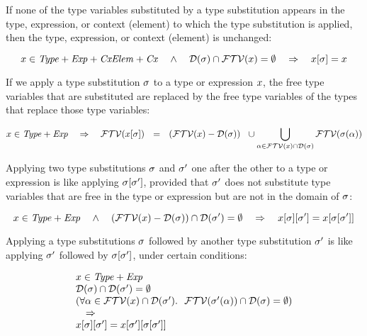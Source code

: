 If none of the type variables substituted by a type substitution appears in
the type, expression, or context (element) to which the type substitution is
applied, then the type, expression, or context (element) is unchanged:

\begin{theorem}\label{thm-tsbs-not-free}
\[
x\in\mathit{Type}+\mathit{Exp}+\mathit{CxElem}+\mathit{Cx}
\ \ \ \wedge\ \ \
\mathcal{D}(\sigma)\cap\mathcal{FTV}(x)=\emptyset
\ \ \ \Rightarrow\ \ \
x[\sigma]=x
\]
\end{theorem}

If we apply a type substitution $\sigma$ to a type or expression $x$, the
free type variables that are substituted are replaced by the free type
variables of the types that replace those type variables:

\begin{theorem}\label{thm-ftvar-of-tsbs}
\[
x\in\mathit{Type}+\mathit{Exp}
\ \ \ \Rightarrow\ \ \
\mathcal{FTV}(x[\sigma])
\ \ =\ \
(\mathcal{FTV}(x)-\mathcal{D}(\sigma))
\ \ \cup
\bigcup_{\alpha\in\mathcal{FTV}(x)\cap\mathcal{D}(\sigma)}\mathcal{FTV}(\sigma(\alpha))
\]
\end{theorem}

Applying two type substitutions $\sigma$ and $\sigma'$ one after the other
to a type or expression is like applying $\sigma[\sigma']$,
provided that $\sigma'$ does not substitute type variables that are free in
the type or expression but are not in the domain of $\sigma$:

\begin{theorem}\label{thm-tsbs-tsbs}
\[
x\in\mathit{Type}+\mathit{Exp}
\ \ \ \wedge\ \ \
(\mathcal{FTV}(x)-\mathcal{D}(\sigma))\cap\mathcal{D}(\sigma')=\emptyset
\ \ \ \Rightarrow\ \ \
x[\sigma][\sigma'] =
x[\sigma[\sigma']]
\]
\end{theorem}

Applying a type substitutions $\sigma$ followed by another type substitution
$\sigma'$ is like applying $\sigma'$ followed by
$\sigma[\sigma']$, under certain conditions:

\begin{theorem}\label{thm-tsbs-tsbs2}
\[
\begin{array}{l}
x\in\mathit{Type}+\mathit{Exp}
\\
\mathcal{D}(\sigma)\cap\mathcal{D}(\sigma')=\emptyset
\\
(\forall\alpha\in\mathcal{FTV}(x)\cap\mathcal{D}(\sigma').\ \ \mathcal{FTV}(\sigma'(\alpha))\cap\mathcal{D}(\sigma)=\emptyset)
\\
\ \ \ \Rightarrow\ \\
x[\sigma][\sigma'] =
x[\sigma'][\sigma[\sigma']]
\end{array}
\]
\end{theorem}

